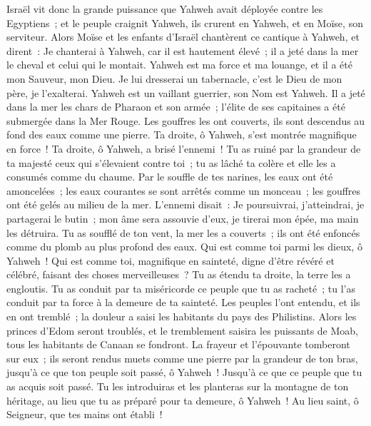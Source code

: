 \begin{multicols}{2}
Israël vit donc la grande puissance que Yahweh avait déployée contre les Egyptiens~; et le peuple craignit Yahweh, ils crurent en Yahweh, et en Moïse, son serviteur.
\VerseOne{}Alors Moïse et les enfants d'Israël chantèrent ce cantique à Yahweh, et dirent~: Je chanterai à Yahweh, car il est hautement élevé~; il a jeté dans la mer le cheval et celui qui le montait.
Yahweh est ma force et ma louange, et il a été mon Sauveur, mon Dieu. Je lui dresserai un tabernacle, c'est le Dieu de mon père, je l'exalterai.
Yahweh est un vaillant guerrier, son Nom est Yahweh.
Il a jeté dans la mer les chars de Pharaon et son armée~; l'élite de ses capitaines a été submergée dans la Mer Rouge.
Les gouffres les ont couverts, ils sont descendus au fond des eaux comme une pierre.
Ta droite, ô Yahweh, s'est montrée magnifique en force~! Ta droite, ô Yahweh, a brisé l'ennemi~!
Tu as ruiné par la grandeur de ta majesté ceux qui s'élevaient contre toi~; tu as lâché ta colère et elle les a consumés comme du chaume.
Par le souffle de tes narines, les eaux ont été amoncelées~; les eaux courantes se sont arrêtés comme un monceau~; les gouffres ont été gelés au milieu de la mer.
L'ennemi disait~: Je poursuivrai, j'atteindrai, je partagerai le butin~; mon âme sera assouvie d'eux, je tirerai mon épée, ma main les détruira.
Tu as soufflé de ton vent, la mer les a couverts~; ils ont été enfoncés comme du plomb au plus profond des eaux.
Qui est comme toi parmi les dieux, ô Yahweh~! Qui est comme toi, magnifique en sainteté, digne d'être révéré et célébré, faisant des choses merveilleuses~?
Tu as étendu ta droite, la terre les a engloutis.
Tu as conduit par ta miséricorde ce peuple que tu as racheté~; tu l'as conduit par ta force à la demeure de ta sainteté.
Les peuples l'ont entendu, et ils en ont tremblé~; la douleur a saisi les habitants du pays des Philistins.
Alors les princes d'Edom seront troublés, et le tremblement saisira les puissants de Moab, tous les habitants de Canaan se fondront.
La frayeur et l'épouvante tomberont sur eux~; ils seront rendus muets comme une pierre par la grandeur de ton bras, jusqu'à ce que ton peuple soit passé, ô Yahweh~! Jusqu'à ce que ce peuple que tu as acquis soit passé.
Tu les introduiras et les planteras sur la montagne de ton héritage, au lieu que tu as préparé pour ta demeure, ô Yahweh~! Au lieu saint, ô Seigneur, que tes mains ont établi~!

\end{multicols}
